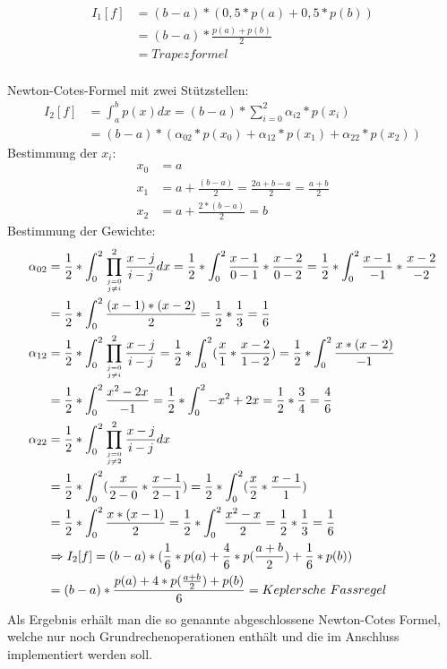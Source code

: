 \documentclass[course=erap]{aspdoc}
\begin{document}
\begin{align*}
I_1[f]&= (b-a)*(0,5*p(a) + 0,5*p(b))\\
&= (b-a)* \frac{p(a)+p(b)}{2}\\
&= Trapezformel
\end{align*}\\
Newton-Cotes-Formel mit zwei Stützstellen:
\begin{align*}
I_2[f] &= \int_{a}^{b}p(x) dx = (b-a)*\sum_{i=0}^{2}\alpha_{i2}*p(x_i)\\
&= (b-a)*(\alpha_{02}*p(x_0)+\alpha_{12}*p(x_1)+\alpha_{22}*p(x_2))
\end{align*}
Bestimmung der $x_i$:
\begin{align*}
x_0 &=a \\
x_1 &= a + \frac{(b-a)}{2} = \frac{2a + b - a}{2} = \frac{a+b}{2}\\
x_2 &= a + \frac{2*(b-a)}{2} = b
\end{align*}
Bestimmung der Gewichte:
\begin{align*}
\alpha_{02} &= \frac{1}{2}*\int_{0}^{2}\prod_{j= 0\atop j \neq i}^{2} \frac{x-j}{i-j}dx 
=\frac{1}{2}*\int_{0}^{2} \frac{x-1}{0-1} * \frac{x-2}{0-2} = \frac{1}{2}*\int_{0}^{2} \frac{x-1}{-1}*\frac{x-2}{-2}\\
&= \frac{1}{2}*\int_{0}^{2}\frac{(x-1)*(x-2)}{2} = \frac{1}{2}*\frac{1}{3} = \frac{1}{6}\\
\alpha_{12} &= \frac{1}{2}*\int_{0}^{2}\prod_{j= 0\atop j \neq i}^{2}\frac{x-j}{i-j} =\frac{1}{2} * \int_{0}^{2}(\frac{x}{1}*\frac{x-2}{1-2}) = \frac{1}{2}*\int_{0}^{2}\frac{x*(x-2)}{-1}\\
&= \frac{1}{2}*\int_{0}^{2}\frac{x^{2}-2x}{-1} = \frac{1}{2}*\int_{0}^{2} -x^{2}+2x = \frac{1}{2} * \frac{3}{4} = \frac{4}{6}\\
\alpha_{22} &= \frac{1}{2} * \int_{0}^{2}\prod_{j= 0\atop j \neq 2}^{2}\frac{x-j}{i-j}dx \\
&= \frac{1}{2}*\int_{0}^{2} (\frac{x}{2-0}*\frac{x-1}{2-1}) = \frac{1}{2}*\int_{0}^{2} (\frac{x}{2}*\frac{x-1}{1}) \\&= \frac{1}{2} * \int_{0}^{2} \frac{x*(x-1)}{2} = \frac{1}{2} * \int_{0}^{2} \frac{x^2-x}{2} = \frac{1}{2} * \frac{1}{3} = \frac{1}{6} \\
&\Rightarrow I_2[f] = (b-a)* (\frac{1}{6} * p(a)+\frac{4}{6} * p(\frac{a+b}{2}) + \frac{1}{6}*p(b)) \\
&= (b-a)*\frac{p(a) + 4*p(\frac{a+b}{2}) + p(b)}{6} = Keplersche\ Fassregel
\end{align*}
Als Ergebnis erhält man die so genannte abgeschlossene Newton-Cotes Formel, welche nur noch Grundrechenoperationen enthält und die im Anschluss implementiert werden soll.\\
\end{document}
